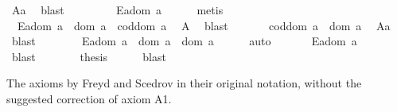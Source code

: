 \begin{isabellebody}
\ A{}a\ \isamarkupfalse%
\ blast\ \ \isanewline
\ \ \ \ \isamarkupfalse%
\ {}{\isacharcolon}\ {\isachardoublequoteopen}\isactrlbold {\isasymnot}{\isacharparenleft}E{\isacharparenleft}a{\isasymcdot}{\isacharparenleft}dom\ a{\isacharparenright}{\isacharparenright}{\isacharparenright}{\isachardoublequoteclose}\ \isamarkupfalse%
\ {}\ {}\ \isamarkupfalse%
\ metis\isanewline
\ \ \ \ \isamarkupfalse%
\ {}{\isacharcolon}\ {\isachardoublequoteopen}E{\isacharparenleft}a{\isasymcdot}{\isacharparenleft}dom\ a{\isacharparenright}{\isacharparenright}\ \isactrlbold {\isasymleftrightarrow}\ dom\ a\ {\isasymcong}\ cod{\isacharparenleft}dom\ a{\isacharparenright}{\isachardoublequoteclose}\ \isamarkupfalse%
\ A{}\ \isamarkupfalse%
\ blast\isanewline
\ \ \ \ \isamarkupfalse%
\ {}{\isacharcolon}\ {\isachardoublequoteopen}cod{\isacharparenleft}dom\ a{\isacharparenright}\ {\isasymcong}\ dom\ a{\isachardoublequoteclose}\ \isamarkupfalse%
\ A{}a\ \isamarkupfalse%
\ blast\ \isanewline
\ \ \ \ \isamarkupfalse%
\ {}{\isacharcolon}\ {\isachardoublequoteopen}E{\isacharparenleft}a{\isasymcdot}{\isacharparenleft}dom\ a{\isacharparenright}{\isacharparenright}\ \isactrlbold {\isasymleftrightarrow}\ dom\ a\ {\isasymcong}\ dom\ a{\isachardoublequoteclose}\ \isamarkupfalse%
\ {}\ {}\ \isamarkupfalse%
\ auto\isanewline
\ \ \ \ \isamarkupfalse%
\ {}{\isacharcolon}\ {\isachardoublequoteopen}E{\isacharparenleft}a{\isasymcdot}{\isacharparenleft}dom\ a{\isacharparenright}{\isacharparenright}{\isachardoublequoteclose}\ \isamarkupfalse%
\ {}\ \isamarkupfalse%
\ blast\isanewline
\ \ \ \ \isamarkupfalse%
\ \isamarkupfalse%
\ {\isacharquery}thesis\ \isamarkupfalse%
\ {}\ {}\ \isamarkupfalse%
\ blast\isanewline
\ \ \ \ \isamarkupfalse%
%
\endisatagproof
{\isafoldproof}%
%
\isadelimproof
\isanewline
%
\endisadelimproof
\ \ \isamarkupfalse%
%
\isamarkuptrue%
%
\begin{isamarkuptext}%
The axioms by Freyd and Scedrov in their original notation, without the suggested 
     correction of axiom A1.


\end{isamarkuptext}
\end{isabellebody}
